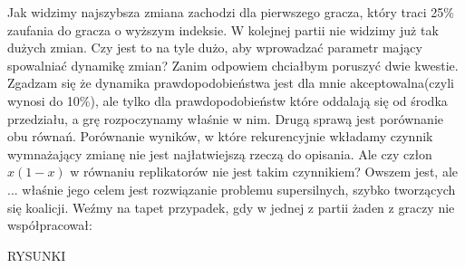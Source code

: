 Jak widzimy najszybsza zmiana zachodzi dla pierwszego gracza, który traci 25\% zaufania do gracza o wyższym indeksie. W kolejnej partii nie widzimy już tak dużych zmian. Czy jest to na tyle dużo, aby wprowadzać parametr mający spowalniać dynamikę zmian? Zanim odpowiem chciałbym poruszyć dwie kwestie. Zgadzam się że dynamika prawdopodobieństwa jest dla mnie akceptowalna(czyli wynosi do 10\%), ale tylko dla prawdopodobieństw które oddalają się od środka przedziału, a grę rozpoczynamy właśnie w nim. Drugą sprawą jest porównanie obu równań. Porównanie wyników, w które rekurencyjnie wkładamy czynnik wymnażający zmianę nie jest najłatwiejszą rzeczą do opisania. Ale czy człon $x(1-x)$ w równaniu replikatorów nie jest takim czynnikiem? Owszem jest, ale ... właśnie jego celem jest rozwiązanie problemu supersilnych, szybko tworzących się koalicji.
Weźmy na tapet przypadek, gdy w jednej z partii żaden z graczy nie współpracował:

RYSUNKI
